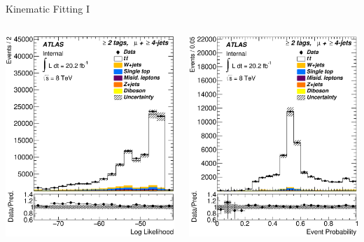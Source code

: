 \documentclass{beamer}
\begin{document}
{\begin{frame}{Kinematic Fitting I}
\begin{columns}
       \begin{center}\includegraphics[width=.75\textwidth]{../chapters/whel/figures/control_Plots2/bTag_2incl_NoLHCut/LogLikelihood_mu}\end{center}
       \begin{center}\includegraphics[width=.75\textwidth]{../chapters/whel/figures/control_Plots2/bTag_2incl/EventProbability_mu}\end{center}
     \end{columns}
  \end{frame}

}
\end{document}

